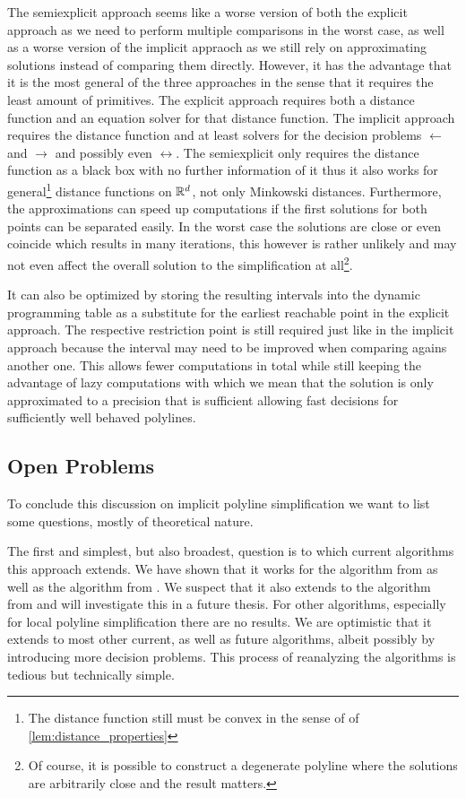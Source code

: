 The semiexplicit approach seems like a worse version of both the explicit approach as we need to perform multiple comparisons in the worst case, as well as a worse version of the implicit appraoch as we still rely on approximating solutions instead of comparing them directly. However, it has the advantage that it is the most general of the three approaches in the sense that it requires the least amount of primitives. The explicit approach requires both a distance function and an equation solver for that distance function. The implicit approach requires the distance function and at least solvers for the decision problems \(\leftarrow\) and \(\rightarrow\) and possibly even \(\leftrightarrow\). The semiexplicit only requires the distance function as a black box with no further information of it thus it also works for general\footnote{The distance function still must be convex in the sense of of \cref{lem:distance_properties}} distance functions on \(\mathbb{R}^d\), not only Minkowski distances. Furthermore, the approximations can speed up computations if the first solutions for both points can be separated easily. In the worst case the solutions are close or even coincide which results in many iterations, this however is rather unlikely and may not even affect the overall solution to the simplification at all\footnote{Of course, it is possible to construct a degenerate polyline where the solutions are arbitrarily close and the result matters.}.

It can also be optimized by storing the resulting intervals into the dynamic programming table as a substitute for the earliest reachable point in the explicit approach. The respective restriction point is still required just like in the implicit approach because the interval may need to be improved when comparing agains another one. This allows fewer computations in total while still keeping the advantage of lazy computations with which we mean that the solution is only approximated to a precision that is sufficient allowing fast decisions for sufficiently well behaved polylines.

\subsection{Open Problems}
To conclude this discussion on implicit polyline simplification we want to list some questions, mostly of theoretical nature. 

The first and simplest, but also broadest, question is to which current algorithms this approach extends. We have shown that it works for the algorithm from \citeauthor{computing_the_frechet_distance_between_two_polygonal_curves} as well as the algorithm from \citeauthor{on_optimal_polyline_simplification_using_the_hausdorff_and_frechet_distance}. We suspect that it also extends to the algorithm from \citeauthor{polyline_simplification_has_cubic_complexity_bringmannetal} and will investigate this in a future thesis. For other algorithms, especially for local polyline simplification there are no results. We are optimistic that it extends to most other current, as well as future algorithms, albeit possibly by introducing more decision problems. This process of reanalyzing the algorithms is tedious but technically simple. 

